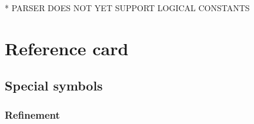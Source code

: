 \documentclass{article}
\begin{document}
%

* PARSER DOES NOT YET SUPPORT LOGICAL CONSTANTS

\newpage
\appendix
\section{Reference card}\label{app:ref-card}

\setcounter{secnumdepth}{2}
\zedindent

\subsection{Special \Circus{} symbols}
\vspace*{-0.5ex}

\subsubsection{Refinement}
\vspace*{-2.5ex}
\end{document}
